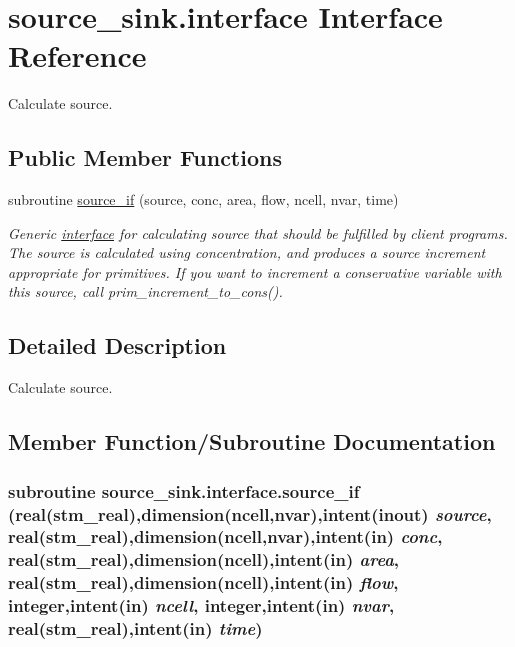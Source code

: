 \hypertarget{a00002}{
\section{source\_\-sink.interface Interface Reference}
\label{a00002}
}
Calculate source.  


\subsection*{Public Member Functions}
\begin{CompactItemize}
\item 
subroutine \hyperlink{a00002_e00a1cfe39008d360c191bd31954d7c7}{source\_\-if} (source, conc, area, flow, ncell, nvar, time)
\begin{CompactList}\small\item\em Generic \hyperlink{a00002}{interface} for calculating source that should be fulfilled by client programs. The source is calculated using concentration, and produces a source increment appropriate for primitives. If you want to increment a conservative variable with this source, call prim\_\-increment\_\-to\_\-cons(). \item\end{CompactList}\end{CompactItemize}


\subsection{Detailed Description}
Calculate source. 

\subsection{Member Function/Subroutine Documentation}
\hypertarget{a00002_e00a1cfe39008d360c191bd31954d7c7}{
\subsubsection[{source\_\-if}]{\setlength{\rightskip}{0pt plus 5cm}subroutine source\_\-sink.interface.source\_\-if (real(stm\_\-real),dimension(ncell,nvar),intent(inout) {\em source}, \/  real(stm\_\-real),dimension(ncell,nvar),intent(in) {\em conc}, \/  real(stm\_\-real),dimension(ncell),intent(in) {\em area}, \/  real(stm\_\-real),dimension(ncell),intent(in) {\em flow}, \/  integer,intent(in) {\em ncell}, \/  integer,intent(in) {\em nvar}, \/  real(stm\_\-real),intent(in) {\em time})}}
\label{a00002_e00a1cfe39008d360c191bd31954d7c7}



